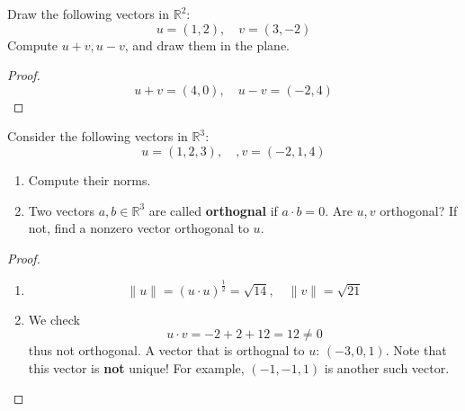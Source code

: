 \documentclass[openany]{book}
\newcommand{\R}{\mathbb{R}}
\begin{document}
\begin{prob}
    Draw the following vectors in $\R^2$:
    \begin{equation*}
        u=(1,2), \quad v=(3,-2)
    \end{equation*}
    Compute $u+v, u-v$, and draw them in the plane.
\end{prob}
\begin{proof}
    \begin{equation*}
        u+v=(4,0), \quad u-v=(-2, 4)
    \end{equation*}
\end{proof}

\begin{prob}
    Consider the following vectors in $\R^3$:
    \begin{equation*}
        u=(1,2,3), \quad, v=(-2, 1, 4)
    \end{equation*}
    \begin{enumerate}
        \item Compute their norms.
        \item  Two vectors $a,b\in\R^3$ are called \textbf{orthognal} if $a\cdot b=0$. Are $u,v$ orthogonal? If not, find a nonzero vector orthogonal to $u$.
    \end{enumerate}
\end{prob}
\begin{proof}
    \begin{enumerate}
        \item \begin{equation*}
            \|u\|=(u\cdot u)^\frac{1}{2}=\sqrt{14}, \quad \|v\|=\sqrt{21}
        \end{equation*}
        \item We check 
        \begin{equation*}
            u\cdot v=-2+2+12=12\neq 0
        \end{equation*}
        thus not orthogonal. A vector that is orthognal to $u$: $(-3,0,1)$. Note that this vector is \textbf{not} unique! For example, $(-1,-1,1)$ is another such vector.
    \end{enumerate}
\end{proof}
\end{document}
